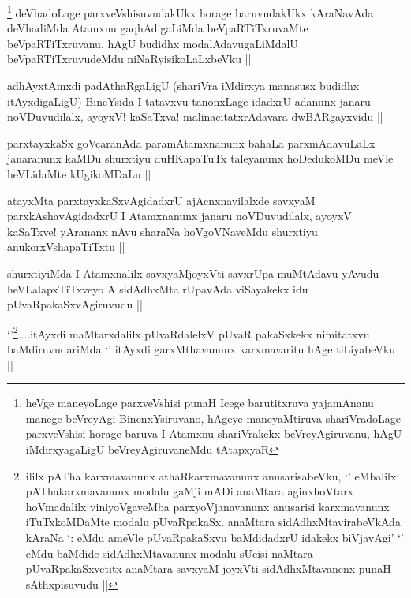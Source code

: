 
\begin{artha}
\footnote{heVge maneyoLage parxveVshisi punaH Icege barutitxruva yajamAnanu manege beVreyAgi BinenxYsiruvano, hAgeye maneyaMtiruva shariVradoLage parxveVshisi horage baruva I Atamxnu shariVrakekx beVreyAgiruvanu, hAgU iMdirxyagaLigU beVreyAgiruvaneMdu tAtapxyaR}
deVhadoLage parxveVshisuvudakUkx horage baruvudakUkx  kAraNavAda deVhadiMda Atamxnu gaqhAdigaLiMda beVpaRTiTxruvaMte beVpaRTiTxruvanu, hAgU budidhx modalAdavugaLiMdalU beVpaRTiTxruvudeMdu niNaRyisikoLaLxbeVku ||
\end{artha}


\begin{artha}
adhAyxtAmxdi padAthaRgaLigU (shariVra iMdirxya manasusx budidhx itAyxdigaLigU) BineYsida I tatavxvu tanonxLage idadxrU adanunx janaru noVDuvudilalx, ayoyxV! kaSaTxva! malinacitatxrAdavara dwBARgayxvidu ||
\end{artha}

\begin{artha}
parxtayxkaSx goVcaranAda paramAtamxnanunx bahaLa parxmAdavuLaLx janaranunx kaMDu shurxtiyu duHKapaTuTx taleyanunx hoDedukoMDu meVle heVLidaMte kUgikoMDaLu ||
\end{artha}


\begin{artha}
atayxMta parxtayxkaSxvAgidadxrU ajAcnxnavilalxde savxyaM parxkAshavAgidadxrU I Atamxnanunx janaru noVDuvudilalx, ayoyxV kaSaTxve! yArananx nAvu sharaNa hoVgoVNaveMdu shurxtiyu anukorxVshapaTiTxtu ||
\end{artha}


\begin{artha}
shurxtiyiMda I Atamxnalilx savxyaMjoyxVti savxrUpa muMtAdavu yAvudu heVLalapxTiTxveyo A sidAdhxMta rUpavAda viSayakekx idu pUvaRpakaSxvAgiruvudu ||
\end{artha}


\begin{artha}
`\stext'\footnote{ililx pATha karxmavanunx athaRkarxmavanunx anusarisabeVku, `\stext' eMbalilx pAThakarxmavanunx modalu gaMji mADi anaMtara aginxhoVtarx hoVmadalilx  viniyoVgaveMba parxyoVjanavanunx anusarisi karxmavanunx iTuTxkoMDaMte modalu pUvaRpakaSx. anaMtara sidAdhxMtavirabeVkAda kAraNa `\stext: eMdu ameVle pUvaRpakaSxvu baMdidadxrU idakekx biVjavAgi'  `\stext' eMdu baMdide sidAdhxMtavanunx modalu sUcisi naMtara pUvaRpakaSxvetitx anaMtara savxyaM joyxVti sidAdhxMtavanenx punaH sAthxpisuvudu ||}....itAyxdi maMtarxdalilx pUvaRdalelxV pUvaR pakaSxkekx nimitatxvu baMdiruvudariMda `\stext' itAyxdi garxMthavanunx karxmavaritu hAge tiLiyabeVku ||
\end{artha}

